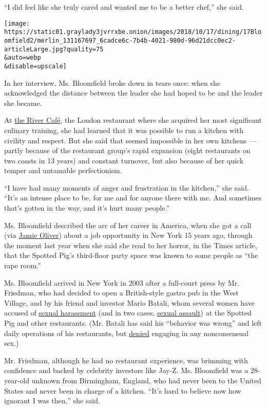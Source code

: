 ``I did feel like she truly cared and wanted me to be a better chef,''
she said.

\texttt{[image: https://static01.graylady3jvrrxbe.onion/images/2018/10/17/dining/17Bloomfield2/merlin\_131167697\_6cadce6c-7b4b-4021-980d-96d21dcc0ec2-articleLarge.jpg?quality=75\\\&auto=webp\\\&disable=upscale]}

In her interview, Ms. Bloomfield broke down in tears once: when she
acknowledged the distance between the leader she had hoped to be and the
leader she became.

At \href{http://www.rivercafe.co.uk/}{the River Café}, the London
restaurant where she acquired her most significant culinary training,
she had learned that it was possible to run a kitchen with civility and
respect. But she said that seemed impossible in her own kitchens ---
partly because of the restaurant group's rapid expansion (eight
restaurants on two coasts in 13 years) and constant turnover, but also
because of her quick temper and untamable perfectionism.

``I have had many moments of anger and frustration in the kitchen,'' she
said. ``It's an intense place to be, for me and for anyone there with
me. And sometimes that's gotten in the way, and it's hurt many people.''

Ms. Bloomfield described the arc of her career in America, when she got
a call (via \href{https://www.jamieoliver.com/}{Jamie Oliver}) about a
job opportunity in New York 15 years ago, through the moment last year
when she said she read to her horror, in the Times article, that the
Spotted Pig's third-floor party space was known to some people as ``the
rape room.''

Ms. Bloomfield arrived in New York in 2003 after a full-court press by
Mr. Friedman, who had decided to open a British-style gastro pub in the
West Village, and by his friend and investor Mario Batali, whom several
women have accused of
\href{https://www.nytimes3xbfgragh.onion/2017/12/11/dining/mario-batali-sexual-misconduct.html}{sexual
harassment} (and in two cases,
\href{https://www.nytimes3xbfgragh.onion/2018/05/21/dining/mario-batali-sexual-assault.html}{sexual
assault}) at the Spotted Pig and other restaurants. (Mr. Batali has said
his ``behavior was wrong'' and left daily operations of his restaurants,
but
\href{https://www.nytimes3xbfgragh.onion/2018/05/21/dining/mario-batali-sexual-assault.html}{denied}
engaging in any nonconsensual sex.)

Mr. Friedman, although he had no restaurant experience, was brimming
with confidence and backed by celebrity investors like Jay-Z. Ms.
Bloomfield was a 28-year-old unknown from Birmingham, England, who had
never been to the United States and never been in charge of a kitchen.
``It's hard to believe now how ignorant I was then,'' she said.

